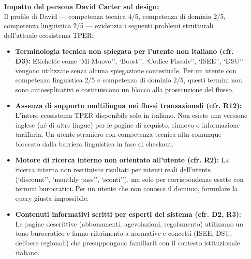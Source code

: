 \documentclass[11pt,a4paper]{article}
\begin{document}
\vspace{0.3cm}

\begin{tcolorbox}[colback=backgroundColor,colframe=borderColor,arc=2mm]
    {\small
    \textbf{Impatto del persona David Carter sul design:} \\[4pt]
    Il profilo di David --- competenza tecnica 4/5, competenza di dominio 2/5, competenza linguistica 2/5 --- evidenzia i seguenti problemi strutturali dell'attuale ecosistema TPER:
    \begin{itemize}[leftmargin=*]
        \item \textbf{Terminologia tecnica non spiegata per l'utente non italiano (cfr. D3):} Etichette come `Mi Muovo'', `Boost'', `Codice Fiscale'', `ISEE'', `DSU'' vengono utilizzate senza alcuna spiegazione contestuale. Per un utente con competenza linguistica 2/5 e competenza di dominio 2/5, questi termini non sono autoesplicativi e costituiscono un blocco alla prosecuzione del flusso.
        \item \textbf{Assenza di supporto multilingua nei flussi transazionali (cfr. R12):} L'intero ecosistema TPER \e disponibile solo in italiano. Non esiste una versione inglese (n\'e di altre lingue) per le pagine di acquisto, rinnovo o informazione tariffaria. Un utente straniero con competenza tecnica alta \e comunque bloccato dalla barriera linguistica in fase di checkout.
        \item \textbf{Motore di ricerca interno non orientato all'utente (cfr. R2):} La ricerca interna non restituisce risultati per intenti reali dell'utente (`discount'', `monthly pass'', `sconti''), ma solo per corrispondenze esatte con termini burocratici. Per un utente che non conosce il dominio, formulare la query giusta \e impossibile.
        \item \textbf{Contenuti informativi scritti per esperti del sistema (cfr. D2, R3):} Le pagine descrittive (abbonamenti, agevolazioni, regolamento) utilizzano un tono burocratico e fanno riferimento a normative e concetti (ISEE, DSU, delibere regionali) che presuppongono familiarit\ con il contesto istituzionale italiano.
    \end{itemize}
    }
\end{tcolorbox}

\vspace{0.3cm}
\end{document}
